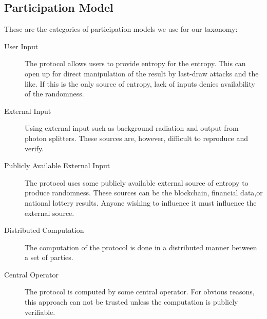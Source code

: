 \subsection{Participation Model}
\label{sub:participation_model}
These are the categories of participation models we use for our taxonomy: 

\begin{description}
    \item [User Input] The protocol allows users to provide entropy for the entropy. This can open up for direct manipulation of the result by last-draw attacks and the like. If this is the only source of entropy, lack of inputs denies availability of the randomness.
    \item [External Input] Using external input such as background radiation and output from photon splitters. These sources are, however, difficult to reproduce and verify.
    \item [Publicly Available External Input] The protocol uses some publicly available external source of entropy to produce randomness. These sources can be the blockchain, financial data,or national lottery results. Anyone wishing to influence it must influence the external source.
    \item [Distributed Computation]
    The computation of the protocol is done in a distributed manner between a set of parties. 
    \item [Central Operator] The protocol is computed by some central operator. For obvious reasons, this approach can not be trusted unless the computation is publicly verifiable. 
\end{description}

